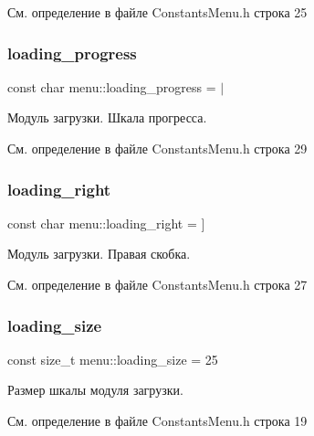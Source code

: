 См. определение в файле Constants\+Menu.\+h строка 25

\mbox{\label{namespacemenu_ab79f369195d81dcb241b1ab5269c9d3d}} 
\subsubsection{\texorpdfstring{loading\+\_\+progress}{loading\_progress}}
{\footnotesize\ttfamily const char menu\+::loading\+\_\+progress = \textquotesingle{}$\vert$\textquotesingle{}}

Модуль загрузки. Шкала прогресса. 

См. определение в файле Constants\+Menu.\+h строка 29

\mbox{\label{namespacemenu_a272b2c0c591457b2aeccaae0c122a1fc}} 
\subsubsection{\texorpdfstring{loading\+\_\+right}{loading\_right}}
{\footnotesize\ttfamily const char menu\+::loading\+\_\+right = \textquotesingle{}\mbox{]}\textquotesingle{}}

Модуль загрузки. Правая скобка. 

См. определение в файле Constants\+Menu.\+h строка 27

\mbox{\label{namespacemenu_aa3bc0d7f62e04dc52dd8f276902448ae}} 
\subsubsection{\texorpdfstring{loading\+\_\+size}{loading\_size}}
{\footnotesize\ttfamily const size\+\_\+t menu\+::loading\+\_\+size = 25}

Размер шкалы модуля загрузки. 

См. определение в файле Constants\+Menu.\+h строка 19

